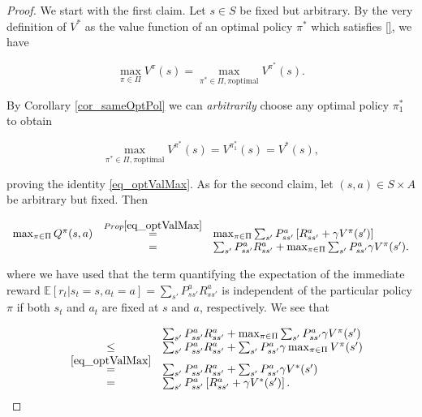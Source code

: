 \documentclass[11pt]{article} %
\begin{document}
\begin{proof}
	We start with the first claim. Let $s \in S$ be fixed but arbitrary. By the very definition of $V^*$ as the value function of an optimal policy $\pi^*$ which satisfies \ref{}, we have

	\begin{equation}
		\max_{\pi \in \Pi} V^{\pi}(s) = \max_{\pi^* \in \Pi, \pi \text{optimal}} V^{\pi^*}(s).
	\end{equation}

	By Corollary \ref{cor_sameOptPol} we can \textit{arbitrarily} choose any optimal policy $\pi^*_1$ to obtain

	\begin{equation}
		\max_{\pi^* \in \Pi, \pi \text{optimal}} V^{\pi^*}(s) = V^{\pi^*_1}(s) = V^*(s),
	\end{equation}

	proving the identity \ref{eq_optValMax}. As for the second claim, let $(s,a) \in S \times A$ be arbitrary but fixed. Then

	\begin{equation}
		\begin{array}{rcl}
		\max_{\pi \in \Pi}Q^{\pi}(s,a) & \overset{Prop \ref{eq_optValMax}}{=} & \max_{\pi \in \Pi} \sum_{s'} P_{ss'}^a \left[ R_{ss'}^a + \gamma V^{\pi}(s') \right] \\
			& = & \sum_{s'} P_{ss'}^a R_{ss'}^a + \max_{\pi \in \Pi} \sum_{s'} P_{ss'}^a \gamma V^{\pi}(s').
		\end{array}
	\end{equation}

	where we have used that the term quantifying the expectation of the immediate reward $\mathbb{E}[r_t| s_t = s, a_t = a] = \sum_{s'} P_{ss'}^a R_{ss'}^a$ is independent of the particular policy $\pi$ if both $s_t$ and $a_t$ are fixed at $s$ and $a$, respectively. We see that

	\begin{equation}
		\begin{array}{rcl}
			& & \sum_{s'} P_{ss'}^a R_{ss'}^a + \max_{\pi \in \Pi} \sum_{s'} P_{ss'}^a \gamma V^{\pi}(s') \\
			& \le & \sum_{s'} P_{ss'}^a R_{ss'}^a + \sum_{s'} P_{ss'}^a \gamma  \max_{\pi \in \Pi} V^{\pi}(s') \\
			& \overset{\ref{eq_optValMax}}{=} & \sum_{s'} P_{ss'}^a R_{ss'}^a + \sum_{s'} P_{ss'}^a \gamma V^*(s') \\
			& = & \sum_{s'} P_{ss'}^a \left[ R_{ss'}^a + \gamma V^*(s') \right]. \\
		\end{array}
	\end{equation}


\end{proof}
\end{document}
